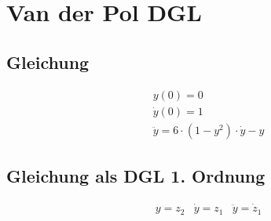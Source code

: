 \documentclass[10pt]{scrartcl}
\author{Oliver Steenbuck, Karolina Bernat}
\title{\titletext}
\date{31.10.2012}
\begin{document}
\maketitle
\setcounter{tocdepth}{3}
\tableofcontents
\listoffigures
\lstlistoflistings

\section{Van der Pol DGL}
	\subsection{Gleichung}
		\begin{align}
		&y(0) = 0\\
		&\dot{y}(0) = 1\\
		&\ddot{y} = 6 \cdot (1-y^2) \cdot \dot{y} -y
		\end{align}
	\subsection{Gleichung als DGL 1. Ordnung}
		\begin{align}
			&y = z_2
			&\dot{y} = z_1	
			&\ddot{y} = \dot{z}_1
		\end{align}
\end{document}
